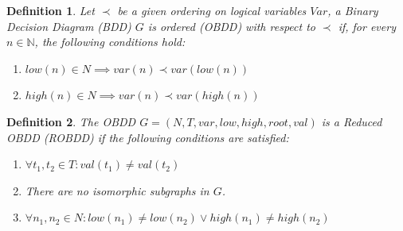 \documentclass[pdflatex,sn-mathphys-num]{sn-jnl}%
\theoremstyle{thmstyleone}%
\theoremstyle{thmstyletwo}%
\theoremstyle{thmstylethree}%
\newtheorem{definition}{Definition}%
\begin{document}
        \vspace*{0.5em}

        \begin{definition}
            Let $\prec$ be a given ordering on logical variables $V\!ar$, a Binary Decision Diagram (BDD) $G$ is ordered (OBDD) with respect to $\prec$ if, for every $n \in \mathbb{N}$, the following conditions hold:
            \begin{enumerate}[noindent]
                \item $low(n) \in N \implies var(n) \prec var(low(n))$
                \item $high(n) \in N \implies var(n) \prec var(high(n))$
            \end{enumerate}
        \end{definition}

        \begin{definition}
            The OBDD $G = (N, T, var, low, high, root, val)$ is a Reduced OBDD (ROBDD) if the following conditions are satisfied:
            \begin{enumerate}[noindent]
                \item $\forall t_1, t_2 \in T : val(t_1) \neq val(t_2)$
                \item There are no isomorphic subgraphs in $G$.
                \item $\forall n_1, n_2 \in N : low(n_1) \neq low(n_2) \lor high(n_1) \neq high(n_2)$
            \end{enumerate}
        \end{definition}
\end{document}

